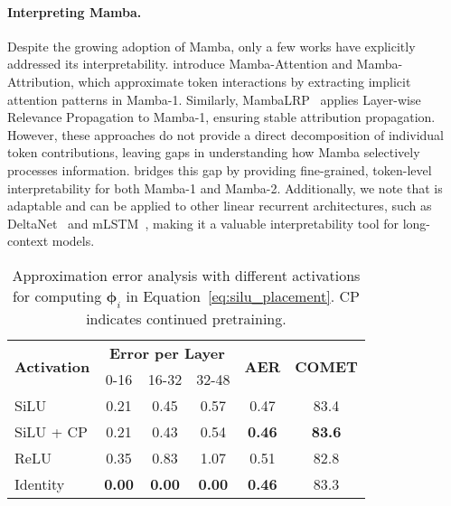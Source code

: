 \paragraph{Interpreting Mamba.}
Despite the growing adoption of Mamba, only a few works have explicitly addressed its interpretability.
\citet{ali2024hiddenattentionmambamodels} introduce Mamba-Attention and Mamba-Attribution, which approximate token interactions by extracting implicit attention patterns in Mamba-1.
Similarly, MambaLRP~\citep{jafari2024mambalrp} applies Layer-wise Relevance Propagation to Mamba-1, ensuring stable attribution propagation.
However, these approaches do not provide a direct decomposition of individual token contributions, leaving gaps in understanding how Mamba selectively processes information.
\methodname bridges this gap by providing fine-grained, token-level interpretability for both Mamba-1 and Mamba-2. Additionally, we note that \methodname is adaptable and can be applied to other linear recurrent architectures, such as DeltaNet~\citep{yang2024parallelizing} and mLSTM~\citep{beck2024xlstm}, making it a valuable interpretability tool for long-context models.





\begin{table}[t]
\centering
\small
\setlength{\tabcolsep}{4.5pt} %
\begin{tabular}{lccccc}
\toprule
\multirow{2}{*}{\textbf{Activation}} & \multicolumn{3}{c}{\textbf{Error per Layer}} & \multirow{2}{*}{\textbf{AER}} & \multirow{2}{*}{\textbf{COMET}}\\
\cmidrule(lr){2-4}
& 0-16 & 16-32 & 32-48 & \\
\midrule
\textsf{SiLU} & 0.21  & 0.45  & 0.57 & 0.47 & 83.4 \\
\textsf{SiLU} + CP & 0.21 & 0.43 & 0.54 & \textbf{0.46} & \textbf{83.6} \\
\textsf{ReLU} & 0.35 & 0.83 & 1.07 & 0.51 & 82.8 \\
\textsf{Identity} & \textbf{0.00} & \textbf{0.00}  & \textbf{0.00} & \textbf{0.46} & 83.3 \\
\bottomrule
\end{tabular}
\caption{Approximation error analysis with different activations for computing $\bm{\phi}_i$ in Equation~\ref{eq:silu_placement}. 
CP indicates continued pretraining. }
\label{tab:mt_approx_error}
\end{table}